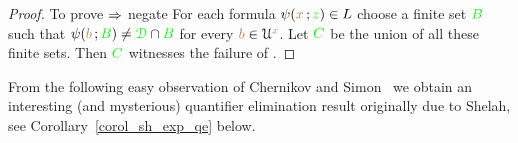 \begin{proof}
To prove $\Rightarrow$ negate 
For each formula $\psi({\color{brown} x}\,;{\color{green} z})\in L$ choose a finite set ${\color{green} B}$ such that $\psi({\color{brown} b}\,;{\color{green} B})\neq{\color{green}\EuScript D}\cap{\color{green}B}$ for every ${\color{brown} b}\in\EuScript U^{\color{brown} x}$.
Let ${\color{green} C}$ be the union of all these finite sets.
Then ${\color{green} C}$ witnesses the failure of .
\end{proof}




From the following easy observation of Chernikov and Simon~\cite{CS} we obtain an interesting (and mysterious) quantifier elimination result originally due to Shelah, see Corollary~\ref{corol_sh_exp_qe} below.

% 
% 
% 
% 
% 
% 
% 
% 
% 

